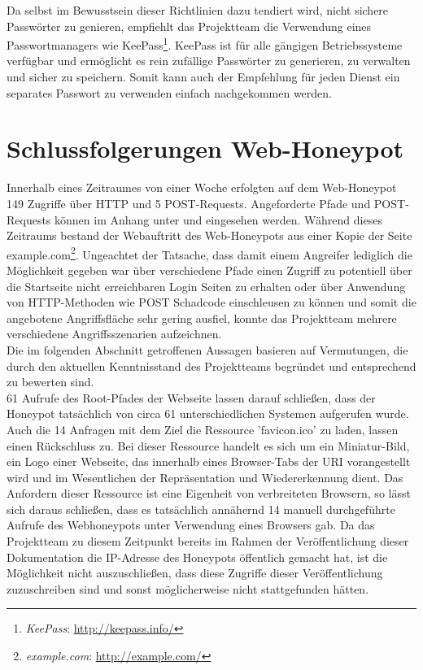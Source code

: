 Da selbst im Bewusstsein dieser Richtlinien dazu tendiert wird, nicht sichere Passwörter zu genieren, empfiehlt das Projektteam die Verwendung eines Passwortmanagers wie KeePass\footnote{ \textit{KeePass}: \url{http://keepass.info/}}. KeePass ist für alle gängigen Betriebssysteme verfügbar und ermöglicht es rein zufällige Passwörter zu generieren, zu verwalten und sicher zu speichern. Somit kann auch der Empfehlung für jeden Dienst ein separates Passwort zu verwenden einfach nachgekommen werden.

\section{Schlussfolgerungen Web-Honeypot}
\label{sec:Schlussfolgerungen Web-Honeypot}

Innerhalb eines Zeitraumes von einer Woche erfolgten auf dem Web-Honeypot 149 Zugriffe über HTTP und 5 POST-Requests. Angeforderte Pfade und POST-Requests können im Anhang unter \textit{} und \textit{} eingesehen werden. Während dieses Zeitraums bestand der Webauftritt des Web-Honeypots aus einer Kopie der Seite example.com\footnote{ \textit{example.com}: \url{http://example.com/}}. Ungeachtet der Tatsache, dass damit einem Angreifer lediglich die Möglichkeit gegeben war über verschiedene Pfade einen Zugriff zu potentiell über die Startseite nicht erreichbaren Login Seiten zu erhalten oder über Anwendung von HTTP-Methoden wie POST Schadcode einschleusen zu können und somit die angebotene Angriffsfläche sehr gering ausfiel, konnte das Projektteam mehrere verschiedene Angriffsszenarien aufzeichnen.\\

Die im folgenden Abschnitt getroffenen Aussagen basieren auf Vermutungen, die durch den aktuellen Kenntnisstand des Projektteams begründet und entsprechend zu bewerten sind.\\

61 Aufrufe des Root-Pfades der Webseite lassen darauf schließen, dass der Honeypot tatsächlich von circa 61 unterschiedlichen Systemen aufgerufen wurde. Auch die 14 Anfragen mit dem Ziel die Ressource 'favicon.ico' zu laden, lassen einen Rückschluss zu.  Bei dieser Ressource handelt es sich um ein Miniatur-Bild, ein Logo einer Webseite, das innerhalb eines Browser-Tabs der URI vorangestellt wird und im Wesentlichen der Repräsentation und Wiedererkennung dient. Das Anfordern dieser Ressource ist eine Eigenheit von verbreiteten Browsern, so lässt sich daraus schließen, dass es tatsächlich annähernd 14 manuell durchgeführte Aufrufe des Webhoneypots unter Verwendung eines Browsers gab. Da das Projektteam zu diesem Zeitpunkt bereits im Rahmen der Veröffentlichung dieser Dokumentation die IP-Adresse des Honeypots öffentlich gemacht hat, ist die Möglichkeit nicht auszuschließen, dass diese Zugriffe dieser Veröffentlichung zuzuschreiben sind und sonst möglicherweise nicht stattgefunden hätten.\\ 

